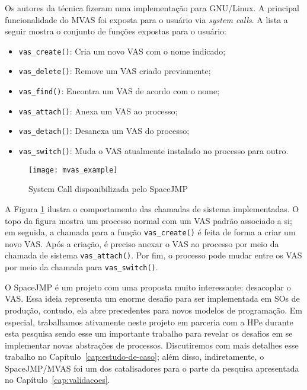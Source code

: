 Os autores da técnica fizeram uma implementação para GNU/Linux. A principal
funcionalidade do MVAS foi exposta para o usuário via \emph{system calls}. A
lista a seguir mostra o conjunto de funções expostas para o usuário:

\begin{itemize}
  \item \texttt{vas\_create()}: Cria um novo VAS com o nome indicado;
  \item \texttt{vas\_delete()}: Remove um VAS criado previamente;
  \item \texttt{vas\_find()}: Encontra um VAS de acordo com o nome;
  \item \texttt{vas\_attach()}: Anexa um VAS ao processo;
  \item \texttt{vas\_detach()}: Desanexa um VAS do processo;
  \item \texttt{vas\_switch()}: Muda o VAS atualmente instalado no processo para outro.
\end{itemize}

\begin{figure}[!h]
  \centering
  \texttt{[image: mvas\_example]} 
	\caption[System Call disponibilizada pelo SpaceJMP]{System Call disponibilizada pelo SpaceJMP \citep{ellarge}}
  \label{fig:mvas_example}
\end{figure}

A Figura \ref{fig:mvas_example} ilustra o comportamento das chamadas de sistema
implementadas. O topo da figura mostra um processo normal com um VAS padrão
associado a si; em seguida, a chamada para a função \texttt{vas\_create()} é
feita de forma a criar um novo VAS. Após a criação, é preciso anexar o VAS ao
processo por meio da chamada de sistema \texttt{vas\_attach()}. Por fim, o
processo pode mudar entre os VAS por meio da chamada para
\texttt{vas\_switch()}.

O SpaceJMP é um projeto com uma proposta muito interessante: desacoplar o VAS.
Essa ideia representa um enorme desafio para ser implementada em SOs de
produção, contudo, ela abre precedentes para novos modelos de programação. Em
especial, trabalhamos ativamente neste projeto em parceria com a HPe durante
esta pesquisa sendo esse um importante trabalho para revelar os desafios em se
implementar novas abstrações de processos. Discutiremos com mais detalhes esse
trabalho no Capítulo~\ref{cap:estudo-de-caso}; além disso, indiretamente, o
SpaceJMP/MVAS foi um dos catalisadores para o parte da pesquisa apresentada no
Capítulo~\ref{cap:validacoes}.

